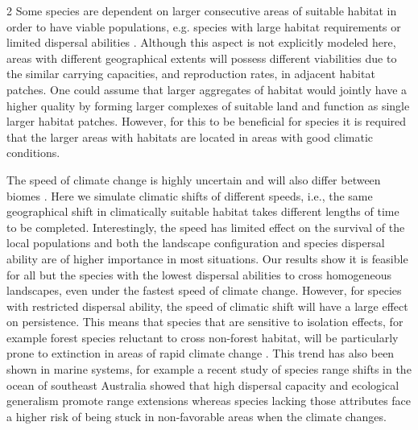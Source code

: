 \documentclass[12pt,pdftex]{article}
\begin{document}
\begin{spacing}{2}
Some species are dependent on larger consecutive areas of suitable habitat in order to have viable populations, e.g. species with large habitat requirements or limited dispersal abilities \citep{Lindenmayer2013, Hanski2011}. Although this aspect is not explicitly modeled here, areas with different geographical extents will possess different viabilities due to the similar carrying capacities, and reproduction rates, in adjacent habitat patches. One could assume that larger aggregates of habitat would jointly have a higher quality by forming larger complexes of suitable land and function as single larger habitat patches. However, for this to be beneficial for species it is required that the larger areas with habitats are located in areas with good climatic conditions. 
 
The speed of climate change is highly uncertain  \citep{Stocker2013} and will also differ between biomes \citep{Loarie2009}. Here we simulate climatic shifts of different speeds, i.e., the same geographical shift in climatically suitable habitat takes different lengths of time to be completed. Interestingly, the speed has limited effect on the survival of the local populations and both the landscape configuration and species dispersal ability are of higher importance in most situations. Our results show it is feasible for all but the species with the lowest dispersal abilities to cross homogeneous landscapes, even under the fastest speed of climate change. However, for species with restricted dispersal ability, the speed of climatic shift will have a large effect on persistence. This means that species that are sensitive to isolation effects, for example forest species reluctant to cross non-forest habitat, will be particularly prone to extinction in areas of rapid climate change  \citep{Melles2011}. This trend has also been shown in marine systems, for example a recent study of species range shifts in the ocean of southeast Australia showed that high dispersal capacity and ecological generalism promote range extensions \citep{Sunday2015} whereas species lacking those attributes face a higher risk of being stuck in non-favorable areas when the climate changes.


\end{spacing}
\end{document}
